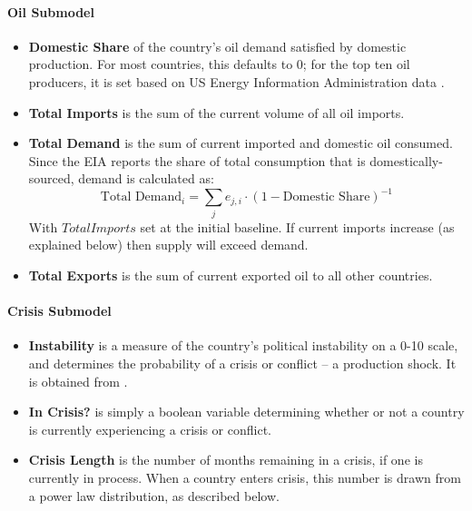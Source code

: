 \documentclass{article}
\begin{document}
\paragraph{Oil Submodel}
\begin{itemize}
	\item \textbf{Domestic Share} of the country's oil demand satisfied by domestic production. For most countries, this defaults to 0; for the top ten oil producers, it is set based on US Energy Information Administration data \citep{}.
	\item \textbf{Total Imports} is the sum of the current volume of all oil imports. 
	\item \textbf{Total Demand} is the sum of current imported and domestic oil consumed. Since the EIA reports the share of total consumption that is domestically-sourced, demand is calculated as: $$\text{Total Demand}_i = \sum_j e_{j,i} \cdot (1 - \text{Domestic Share})^{-1}$$
	With $Total Imports$ set at the initial baseline. If current imports increase (as explained below) then supply will exceed demand. 
	\item \textbf{Total Exports} is the sum of current exported oil to all other countries.
\end{itemize}

\paragraph{Crisis Submodel}
\begin{itemize}
	\item \textbf{Instability} is a measure of the country's political instability on a 0-10 scale, and determines the probability of a crisis or conflict -- a production shock. It is obtained from \citet{eiu_2013}. 
	\item \textbf{In Crisis?} is simply a boolean variable determining whether or not a country is currently experiencing a crisis or conflict.
	\item \textbf{Crisis Length} is the number of months remaining in a crisis, if one is currently in process. When a country enters crisis, this number is drawn from a power law distribution, as described below.
\end{itemize}
\end{document}
